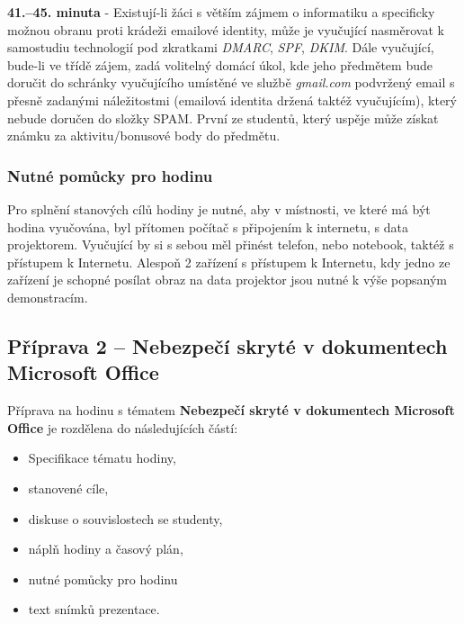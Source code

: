 \documentclass[a4paper, 12pt]{article}
\begin{document}
\textbf{41.--45. minuta} - Existují-li žáci s větším zájmem o informatiku a specificky možnou obranu proti krádeži emailové identity, může je vyučující nasměrovat k samostudiu technologií pod zkratkami \textit{DMARC}, \textit{SPF}, \textit{DKIM}. Dále vyučující, bude-li ve třídě zájem, zadá volitelný domácí úkol, kde jeho předmětem bude doručit do schránky vyučujícího umístěné ve službě \textit{gmail.com} podvržený email s přesně zadanými náležitostmi (emailová identita držená taktéž vyučujícím), který nebude doručen do složky SPAM. První ze studentů, který uspěje může získat známku za aktivitu/bonusové body do předmětu.

\subsubsection{Nutné pomůcky pro hodinu}
Pro splnění stanových cílů hodiny je nutné, aby v místnosti, ve které má být hodina vyučována, byl přítomen počítač s připojením k internetu, s data projektorem. Vyučující by si s sebou měl přinést telefon, nebo notebook, taktéž s přístupem k Internetu. Alespoň 2 zařízení s přístupem k Internetu, kdy jedno ze zařízení je schopné posílat obraz na data projektor jsou nutné k výše popsaným demonstracím.



\subsection{Příprava 2 -- Nebezpečí skryté v dokumentech Microsoft Office}
Příprava na hodinu s tématem \textbf{Nebezpečí skryté v dokumentech Microsoft Office} je rozdělena do následujících částí:
    \begin{itemize}
        \setlength{\itemsep}{-3pt}
        \item Specifikace tématu hodiny,
        \item stanovené cíle,
        \item diskuse o souvislostech se studenty,
        \item náplň hodiny a časový plán,
        \item nutné pomůcky pro hodinu
        \item text snímků prezentace.
    \end{itemize}
\end{document}
